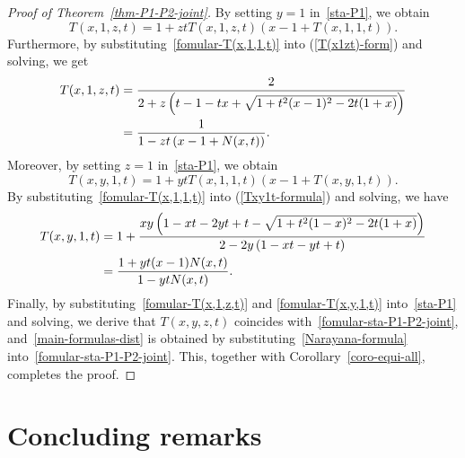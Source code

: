 \documentclass[11pt]{article}
\begin{document}
	\begin{proof}[Proof of Theorem~\ref{thm-P1-P2-joint}]
		By setting $y=1$ in~\eqref{sta-P1}, we obtain
		\begin{equation}\label{T(x1zt)-form}
			T(x,1,z,t)= 1+zt T(x,1,z,t)(x-1+T(x,1,1,t)).
		\end{equation}
		Furthermore, by substituting~\eqref{fomular-T(x,1,1,t)} into (\ref{T(x1zt)-form}) and solving, we get 
		\begin{align}\label{fomular-T(x,1,z,t)}
			T(x,1,z,t)&=\frac{2}{2 + z\left(t-1 - t x + \sqrt{1 + t^{2}(x - 1)^{2} - 2 t (1 + x)}\right) } \notag \\
			&=\frac{1}{1 - zt\left(x-1+N(x,t)\right)}.
		\end{align}
		Moreover, by setting $z=1$ in~\eqref{sta-P1}, we obtain
		\begin{equation}\label{Txy1t-formula}
			T(x,y,1,t)= 1+yt T(x,1,1,t)(x-1+T(x,y,1,t)).
		\end{equation}
		By substituting~\eqref{fomular-T(x,1,1,t)} into (\ref{Txy1t-formula}) and solving, we have
		\begin{align}\label{fomular-T(x,y,1,t)}
			T(x,y,1,t) &=1 + \frac{x y \left(1 - xt- 2yt+t - \sqrt{1 + t^2 (1 - x)^2 - 2 t (1 + x)} \right)}{2 - 2 y \left( 1- xt-yt+t \right)} \notag \\
			&=\frac{1+yt(x-1) N(x,t)}{1-yt N(x,t)}.
		\end{align}
		Finally, by substituting~\eqref{fomular-T(x,1,z,t)} and \eqref{fomular-T(x,y,1,t)} 
		into~\eqref{sta-P1} and solving, we derive that $T(x,y,z,t)$ coincides with~\eqref{fomular-sta-P1-P2-joint}, 
		and~\eqref{main-formulas-dist} is obtained by substituting~\eqref{Narayana-formula} into~\eqref{fomular-sta-P1-P2-joint}.
		This, together with Corollary~\ref{coro-equi-all}, completes the proof.
	\end{proof}
	
	\section{Concluding remarks}
	
\end{document}
